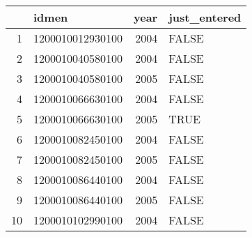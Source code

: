 \begin{table}[ht]
\centering
\begin{tabular}{rlrl}
  \hline
 & idmen & year & just\_entered \\ 
  \hline
1 & 1200010012930100 & 2004 & FALSE \\ 
  2 & 1200010040580100 & 2004 & FALSE \\ 
  3 & 1200010040580100 & 2005 & FALSE \\ 
  4 & 1200010066630100 & 2004 & FALSE \\ 
  5 & 1200010066630100 & 2005 & TRUE \\ 
  6 & 1200010082450100 & 2004 & FALSE \\ 
  7 & 1200010082450100 & 2005 & FALSE \\ 
  8 & 1200010086440100 & 2004 & FALSE \\ 
  9 & 1200010086440100 & 2005 & FALSE \\ 
  10 & 1200010102990100 & 2004 & FALSE \\ 
   \hline
\end{tabular}
\end{table}
